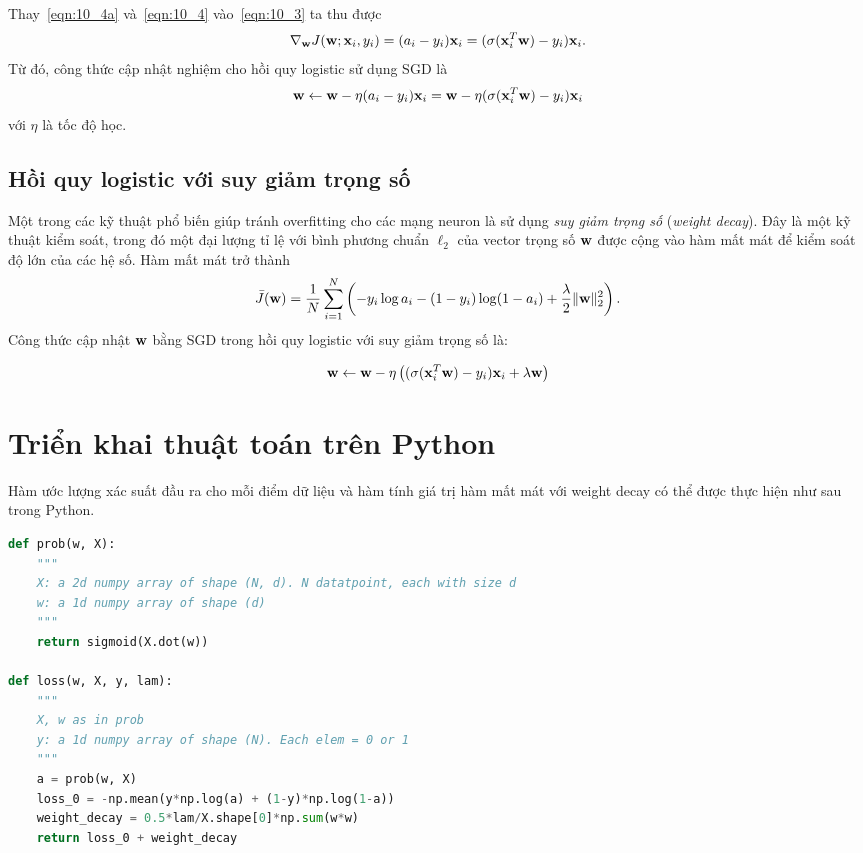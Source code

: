 Thay~\eqref{eqn:10_4a} và~\eqref{eqn:10_4} vào~\eqref{eqn:10_3} ta thu được
\begin{equation}
\nabla_{\mathbf{w}}J(\mathbf{w}; \mathbf{x}_i, y_i)
= (a_i - y_i)\mathbf{x}_i = (\sigma(\mathbf{x}_i^T\mathbf{w}) - y_i)\mathbf{x}_i.
\end{equation}
Từ đó, công thức cập nhật nghiệm cho hồi quy logistic sử dụng SGD là
\begin{equation}
\label{eqn:10_updatew}
\mathbf{w} \leftarrow \mathbf{w} - \eta(a_i - y_i)\mathbf{x}_i =\mathbf{w} - \eta(\sigma(\mathbf{x}_i^T\mathbf{w}) - y_i)\mathbf{x}_i
\end{equation}
với $\eta$ là tốc độ học.

\subsection{Hồi quy logistic với suy giảm trọng số}
Một trong các kỹ thuật phổ biến giúp tránh overfitting cho các mạng neuron là sử
dụng \textit{suy giảm trọng số} (\textit{weight decay}). Đây là một kỹ thuật
kiểm soát, trong đó một đại lượng tỉ lệ với bình phương chuẩn $\ell_2$ của vector
trọng số $\mathbf{w}$ được cộng vào hàm mất mát để kiểm soát độ lớn của các hệ số. Hàm
mất mát trở thành
\begin{equation}
\bar{J}(\mathbf{w}) = \frac{1}{N}\sum_{i=1}^N\left(-y_i \log a_i - (1-y_i) \log (1 - a_i) + \frac{\lambda}{2}\|\mathbf{w}\|_2^2\right).
\end{equation}
Công thức cập nhật $\mathbf{w}$ bằng SGD trong hồi quy logistic với suy giảm trọng số là:

\begin{equation}
\label{eqn:10_updatew_wdecay}
\mathbf{w} \leftarrow \mathbf{w} - \eta\left((\sigma(\mathbf{x}_i^T\mathbf{w}) - y_i)\mathbf{x}_i + \lambda \mathbf{w}\right)
\end{equation}

\section{Triển khai thuật toán trên Python}


Hàm ước lượng xác suất đầu ra cho mỗi điểm dữ liệu và hàm tính giá trị hàm mất mát với weight decay có thể được thực hiện như sau trong Python.
\begin{lstlisting}[language=Python]
def prob(w, X):
    """
    X: a 2d numpy array of shape (N, d). N datatpoint, each with size d
    w: a 1d numpy array of shape (d)
    """
    return sigmoid(X.dot(w))

def loss(w, X, y, lam):
    """
    X, w as in prob
    y: a 1d numpy array of shape (N). Each elem = 0 or 1
    """
    a = prob(w, X)
    loss_0 = -np.mean(y*np.log(a) + (1-y)*np.log(1-a))
    weight_decay = 0.5*lam/X.shape[0]*np.sum(w*w)
    return loss_0 + weight_decay
\end{lstlisting}

